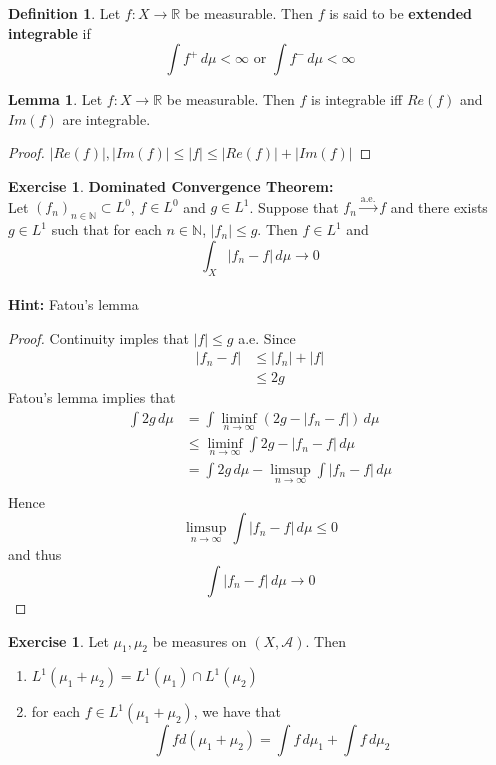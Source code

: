 \documentclass{book}
\theoremstyle{definition}
\newtheorem{defn}[definition]{Definition}
\newtheorem{lem}[definition]{Lemma}
\newtheorem{ex}[definition]{Exercise}
\newcommand{\N}{\mathbb{N}}
\newcommand{\R}{\mathbb{R}}
\newcommand{\MA}{\mathcal{A}}
\newcommand{\lex}[1]{\label{ex:#1}}
\newcommand{\ld}[1]{\label{defn:#1}}
\DeclareMathOperator*{\0}{\mbf{0}}
\DeclareMathOperator*{\1}{\mbf{1}}
\newcommand{\limfn}{\liminf \limits_{n \rightarrow \infty}}
\newcommand{\limpn}{\limsup \limits_{n \rightarrow \infty}}
\newcommand{\convt}[1]{\xrightarrow{\text{#1}}}
\newcommand{\dmu}{\, d \mu}
\begin{document}
	\begin{defn} \ld{00000} 
		Let $f:X \rightarrow \R$ be measurable. Then $f$ is said to be \textbf{extended integrable} if $$\int f^+ \dmu  < \infty \text{ or } \int f^- \dmu < \infty$$
	\end{defn}
	
	\begin{lem}
		Let $f:X \rightarrow \R$ be measurable. Then $f$ is integrable iff $Re(f)$ and $Im(f)$ are integrable.
	\end{lem}
	
	\begin{proof}
		$|Re(f)|, |Im(f)| \leq |f| \leq |Re(f)| + |Im(f)|$
	\end{proof}
	
	\begin{ex}\textbf{Dominated Convergence Theorem:}\\
	\lex{00000}
		Let $(f_n)_{n \in \N} \subset L^0$, $f \in L^0$ and $g \in L^1$. Suppose that $f_n \convt{a.e.} f$ and there exists $g \in L^1$ such that for each $n \in \N$, $|f_n| \leq g$. Then $f \in L^1$ and $$\int_X |f_n - f| \dmu \rightarrow 0$$ \\
		\textbf{Hint:} Fatou's lemma
	\end{ex}
	
	\begin{proof}
	Continuity imples that $|f| \leq g$ a.e. Since 
	\begin{align*}
	|f_n - f| 
	&\leq |f_n| + |f| \\
	&\leq 2g
	\end{align*}	 
	Fatou's lemma implies that 
	\begin{align*}
	\int 2g \dmu 
	&= \int \limfn (2g - |f_n - f|) \dmu \\
	&\leq \limfn \int 2g - |f_n - f| \dmu  \\
	&= \int 2g \dmu - \limpn \int |f_n -f| \dmu \\
	\end{align*}
	Hence $$ \limpn \int |f_n -f| \dmu \leq 0 $$ and thus $$\int |f_n -f| \dmu \rightarrow 0$$
	\end{proof}
	
	\begin{ex} \lex{00000} 
		Let $\mu_1, \mu_2$ be measures on $(X, \MA)$. Then
		\begin{enumerate}
			\item $L^1(\mu_1 + \mu_2) = L^1(\mu_1) \cap L^1(\mu_2)$
			
			\item for each $f \in L^1(\mu_1 + \mu_2)$, we have that $$\int f d(\mu_1 + \mu_2) = \int f \dmu_1 + \int f \dmu_2$$
		\end{enumerate}
		
	\end{ex}
	
\end{document}

